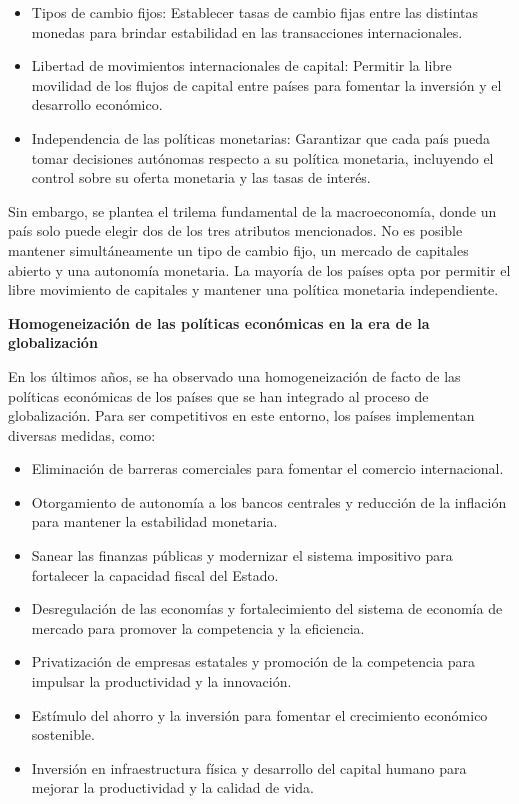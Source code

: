 \documentclass[
  letterpaper,
  DIV=11,
  numbers=noendperiod]{scrartcl}
\begin{document}
\begin{itemize}
\item
  Tipos de cambio fijos: Establecer tasas de cambio fijas entre las
  distintas monedas para brindar estabilidad en las transacciones
  internacionales.
\item
  Libertad de movimientos internacionales de capital: Permitir la libre
  movilidad de los flujos de capital entre países para fomentar la
  inversión y el desarrollo económico.
\item
  Independencia de las políticas monetarias: Garantizar que cada país
  pueda tomar decisiones autónomas respecto a su política monetaria,
  incluyendo el control sobre su oferta monetaria y las tasas de
  interés.
\end{itemize}

Sin embargo, se plantea el trilema fundamental de la macroeconomía,
donde un país solo puede elegir dos de los tres atributos mencionados.
No es posible mantener simultáneamente un tipo de cambio fijo, un
mercado de capitales abierto y una autonomía monetaria. La mayoría de
los países opta por permitir el libre movimiento de capitales y mantener
una política monetaria independiente.

\textbf{Homogeneización de las políticas económicas en la era de la
globalización}

En los últimos años, se ha observado una homogeneización de facto de las
políticas económicas de los países que se han integrado al proceso de
globalización. Para ser competitivos en este entorno, los países
implementan diversas medidas, como:

\begin{itemize}
\item
  Eliminación de barreras comerciales para fomentar el comercio
  internacional.
\item
  Otorgamiento de autonomía a los bancos centrales y reducción de la
  inflación para mantener la estabilidad monetaria.
\item
  Sanear las finanzas públicas y modernizar el sistema impositivo para
  fortalecer la capacidad fiscal del Estado.
\item
  Desregulación de las economías y fortalecimiento del sistema de
  economía de mercado para promover la competencia y la eficiencia.
\item
  Privatización de empresas estatales y promoción de la competencia para
  impulsar la productividad y la innovación.
\item
  Estímulo del ahorro y la inversión para fomentar el crecimiento
  económico sostenible.
\item
  Inversión en infraestructura física y desarrollo del capital humano
  para mejorar la productividad y la calidad de vida.
\end{itemize}
\end{document}
